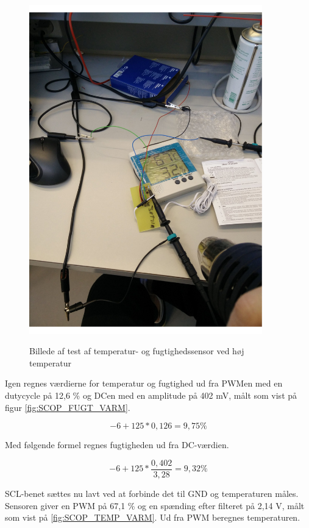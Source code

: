 \begin{figure}[H]
\centering
{\includegraphics[width=0.90\textwidth]{filer/modultest/Billeder/test_VARM}}
\caption{Billede af test af temperatur- og fugtighedssensor ved høj temperatur}
\label{lab:TEST_VARM}
\end{figure}

Igen regnes værdierne for temperatur og fugtighed ud fra PWMen med en dutycycle på 12,6 \% og DCen med en amplitude på 402 mV, målt som vist på figur \ref{fig:SCOP_FUGT_VARM}.

\begin{equation}
-6+125*0,126= 9,75\%
\end{equation}

Med følgende formel regnes fugtigheden ud fra DC-værdien.

\begin{equation}
-6+125*\frac{0,402}{3,28}= 9,32\%
\end{equation}

SCL-benet sættes nu lavt ved at forbinde det til GND og temperaturen måles. Sensoren giver en PWM på 67,1 \% og en spænding efter filteret på 2,14 V, målt som vist på \ref{fig:SCOP_TEMP_VARM}. 
Ud fra PWM beregnes temperaturen.


